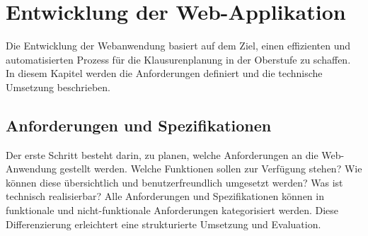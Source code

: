 \newpage
\section{Entwicklung der Web-Applikation}
Die Entwicklung der Webanwendung basiert auf dem Ziel, einen effizienten und automatisierten Prozess für die Klausurenplanung in der Oberstufe zu schaffen. In diesem Kapitel werden die Anforderungen definiert und die technische Umsetzung beschrieben.
\subsection{Anforderungen und Spezifikationen}
Der erste Schritt besteht darin, zu planen, welche Anforderungen an die Web-Anwendung gestellt werden. Welche Funktionen sollen zur Verfügung stehen? Wie können diese übersichtlich und benutzerfreundlich umgesetzt werden? Was ist technisch realisierbar? Alle Anforderungen und Spezifikationen können in funktionale und nicht-funktionale Anforderungen kategorisiert werden. Diese Differenzierung erleichtert eine strukturierte Umsetzung und Evaluation.
